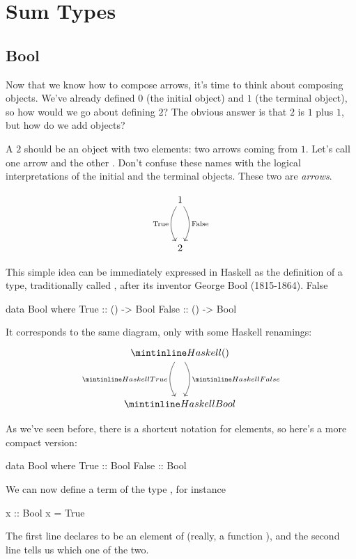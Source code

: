 \documentclass[DaoFP]{subfiles}
\begin{document}
\setcounter{chapter}{2}

\chapter{Sum Types}

\section{Bool}

Now that we know how to compose arrows, it's time to think about composing objects. We've already defined $0$ (the initial object) and $1$ (the terminal object), so how would we go about defining $2$? The obvious answer is that $2$ is $1$ plus $1$, but how do we add objects? 

A $2$ should be an object with two elements: two arrows coming from $1$. Let's call one arrow  and the other . Don't confuse these names with the logical interpretations of the initial and the terminal objects. These two are \emph{arrows}. 

\[
 \begin{tikzcd}
 1
 \arrow[dd, bend right, "\text{True}"']
 \arrow[dd, bend left, "\text{False}"]
 \\
 \\
2
 \end{tikzcd}
\]

This simple idea can be immediately expressed in Haskell as the definition of a type, traditionally called , after its inventor George Bool (1815-1864).
False

\begin{haskell}
data Bool where
  True  :: () -> Bool
  False :: () -> Bool
\end{haskell}
It corresponds to the same diagram, only with some Haskell renamings:
\[
 \begin{tikzcd}
 \hask{()}
 \arrow[dd, bend right, "\hask{True}"']
 \arrow[dd, bend left, "\hask{False}"]
 \\
 \\
\hask{Bool}
 \end{tikzcd}
\]

As we've seen before, there is a shortcut notation for elements, so here's a more compact version:

\begin{haskell}
data Bool where
  True  :: Bool
  False :: Bool
\end{haskell}

We can now define a term of the type , for instance
\begin{haskell}
x :: Bool
x = True
\end{haskell}
The first line declares  to be an element of  (really, a function ), and the second line tells us which one of the two.
\end{document}
